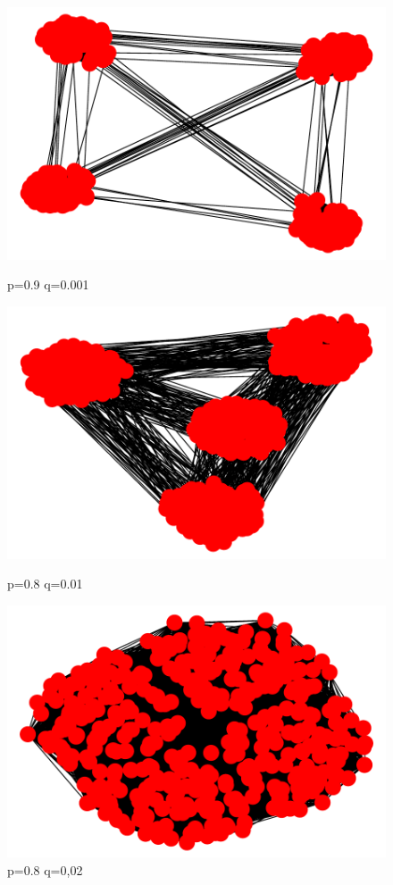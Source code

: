 \documentclass{article}
\begin{document}
\begin{figure}[!ht]
\centering
\begin{minipage}{.33\textwidth}
  \centering
  \includegraphics[width=\linewidth]{plots/graph1p=0,9q=0,001.pdf}
  \caption{p=0.9 q=0.001}
\end{minipage}%
\begin{minipage}{.33\textwidth}
  \centering
  \includegraphics[width=\linewidth]{plots/graph2p=0,8q=0,01.pdf}
  \caption{p=0.8 q=0.01}
\end{minipage}
\begin{minipage}{.33\textwidth}
  \centering
  \includegraphics[width=\linewidth]{plots/graph3p=0,8q=0,02.pdf}
  \caption{p=0.8 q=0,02}
\end{minipage}
\end{figure}
\end{document}
